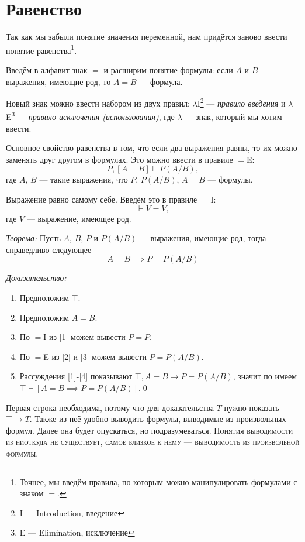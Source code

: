 \section{Равенство}

Так как мы забыли понятие значения переменной,
нам придётся заново ввести понятие равенства\footnote{
	Точнее, мы введём правила, по которым можно манипулировать
	формулами с знаком $=$.
}.

Введём в алфавит знак $=$ и расширим понятие формулы: если $A$ и $B$ --- выражения,
имеющие род, то $A=B$ --- формула.

Новый знак можно ввести набором из двух правил:
$\lambda$I\footnote{I --- Introduction, введение} --- {\it правило введения}
и $\lambda$E\footnote{E --- Elimination, исключение} --- {\it правило
исключения (использования)}, где $\lambda$ --- знак, который мы хотим ввести.

\pagebreak

Основное свойство равенства в том, что если два выражения равны, то их можно
заменять друг другом в формулах. Это можно ввести в правиле $=$E:
\[
	P,[A=B]\vdash P(A/B),
\]
где $A$, $B$ --- такие выражения, что $P$, $P(A/B)$, $A=B$ --- формулы.

Выражение равно самому себе. Введём это в правиле $=$I:
\[
	\vdash V=V,
\]
где $V$ --- выражение, имеющее род.

{\it Теорема:} Пусть $A$, $B$, $P$ и $P(A/B)$ --- выражения, имеющие род,
тогда справедливо следующее
\[
	A=B\implies P=P(A/B)
\]

{\it Доказательство:}
\begin{enumerate}[label=(\arabic*)]
	\item{}\label{1}Предположим $\top$.
	\item{}\label{2}Предположим $A=B$.
	\item{}\label{3}По $=$I из \ref{1} можем вывести $P=P$.
	\item{}\label{4}По $=$E из \ref{2} и \ref{3} можем вывести $P=P(A/B)$.
	\item{}\label{5}Рассуждения \ref{1}-\ref{4} показывают $\top,A=B\to P=P(A/B)$,
	значит по \implic{} имеем $\top\vdash [A=B\implies P=P(A/B)]$.\qed
\end{enumerate}

Первая строка необходима, потому что для доказательства
$T$ нужно показать $\top\to T$. Также из неё удобно выводить формулы,
выводимые из произвольных формул. Далее она будет опускаться,
но подразумеваться.
\textsc{Понятия выводимости из ниоткуда не существует,
	самое близкое к нему --- выводимость из произвольной формулы.}

